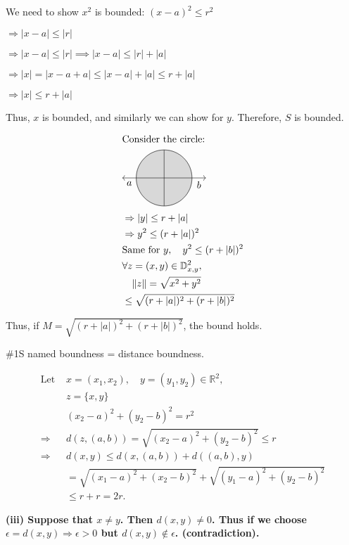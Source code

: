 \documentclass{article}
\theoremstyle{definition}
\numberwithin{equation}{section}
\begin{document}
We need to show \(x^2\) is bounded:
$
(x - a)^2 \le r^2
$

$
\Rightarrow |x - a| \le |r|
$

$
\Rightarrow |x - a| \le |r| \implies |x - a| \le |r| + |a| 
$

$
\Rightarrow |x| = |x - a + a| \le |x - a| + |a| \le r + |a|
$

$
\Rightarrow |x| \le r + |a|
$

Thus, \(x\) is bounded, and similarly we can show for \(y\). Therefore, \(S\) is bounded.

\begin{align*}
& \text{Consider the circle:} \\
& \begin{tikzpicture}
\draw (0,0) circle (1);
\draw[fill=gray,opacity=0.3] (0,0) circle (1);
\draw (-1,0) -- (1,0);
\draw (0,-1) -- (0,1);
\draw[<-] (-1.5,0) -- (-1,0) node[midway,below] {\( a \)};
\draw[->] (1,0) -- (1.5,0) node[midway,below] {\( b \)};
\end{tikzpicture} \\
& \Rightarrow |y| \leq r + |a| \\
& \Rightarrow y^2 \leq (r + |a|)^2 \\
& \text{Same for } y, \quad y^2 \leq (r + |b|)^2 \\
& \forall z = (x, y) \in \mathbb{D}_{x,y}^2, \\
& \quad \|z\| = \sqrt{x^2 + y^2} \\
&\leq \sqrt{(r + |a|)^2 + (r + |b|)^2}
\end{align*}

Thus, if \( M = \sqrt{(r + |a|)^2 + (r + |b|)^2} \), the bound holds.

\#1S named boundness = distance boundness.

\begin{align*}
\text{Let } & x = (x_1, x_2), \quad y = (y_1, y_2) \in \mathbb{R}^2, \\
& z = \{x, y\} \\
& (x_2 - a)^2 + (y_2 - b)^2 = r^2 \\
\Rightarrow & d(z, (a, b)) = \sqrt{(x_2 - a)^2 + (y_2 - b)^2} \leq r \\
\Rightarrow & d(x, y) \leq d(x, (a, b)) + d((a, b), y) \\
& = \sqrt{(x_1 - a)^2 + (x_2 - b)^2} + \sqrt{(y_1 - a)^2 + (y_2 - b)^2} \\
& \leq r + r = 2r.
\end{align*}

\noindent
\textbf{(iii) Suppose that \( x \neq y \). Then \( d(x,y) \neq 0 \). Thus if we choose \( \epsilon = d(x,y) \Rightarrow \epsilon > 0 \) but \( d(x,y) \not \in \epsilon \). (contradiction).}
\end{document}
